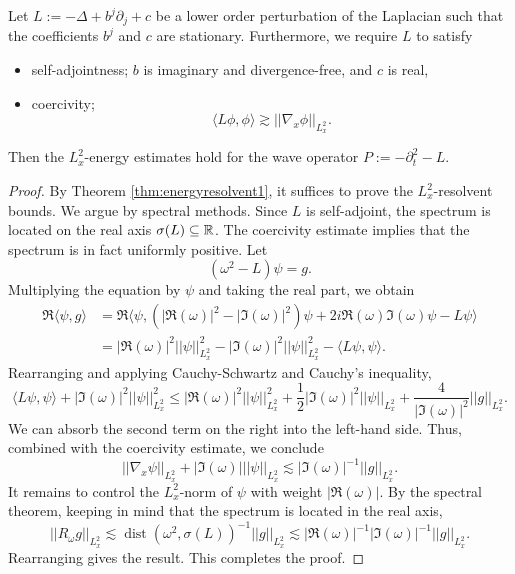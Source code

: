 \begin{corollary}\label{cor:inspiration}
	Let $L := - \Delta + b^j \partial_j + c$ be a lower order perturbation of the Laplacian such that the coefficients $b^j$ and $c$ are stationary. Furthermore, we require $L$ to satisfy
		\begin{itemize}
			\item self-adjointness; $b$ is imaginary and divergence-free, and $c$ is real, 
			\item coercivity; 
				\[
					\langle L \phi, \phi \rangle \gtrsim ||\nabla_x \phi||_{L^2_x}.
				\]
		\end{itemize}
	Then the $L^2_x$-energy estimates hold for the wave operator $P := -\partial_t^2 - L$. 
\end{corollary}

\begin{proof}
	By Theorem \ref{thm:energyresolvent1}, it suffices to prove the $L^2_x$-resolvent bounds. We argue by spectral methods. Since $L$ is self-adjoint, the spectrum is located on the real axis $\sigma(L) \subseteq \mathbb R$. The coercivity estimate implies that the spectrum is in fact uniformly positive. Let
		\[
			(\omega^2 - L) \psi = g.
		\]
	Multiplying the equation by $\psi$ and taking the real part, we obtain
		\begin{align*}
			\Re \langle \psi, g \rangle
				& = \Re \langle \psi, (|\Re (\omega)|^2 - |\Im (\omega)|^2) \psi + 2 i \Re (\omega) \Im(\omega) \psi - L \psi \rangle \\
				&= |\Re (\omega)|^2 ||\psi||_{L^2_x}^2 - |\Im (\omega)|^2 ||\psi||_{L^2_x}^2 - \langle L\psi, \psi \rangle.
		\end{align*}
	Rearranging and applying Cauchy-Schwartz and Cauchy's inequality, 
		\[
			 \langle L\psi, \psi \rangle +  |\Im (\omega)|^2 ||\psi||_{L^2_x}^2 \leq |\Re(\omega)|^2 ||\psi||_{L^2_x}^2 + \frac12 |\Im (\omega)|^2||\psi||_{L^2_x} +  \frac{4}{|\Im (\omega)|^2}    ||g||_{L^2_x}.
		\]	
	We can absorb the second term on the right into the left-hand side. Thus, combined with the coercivity estimate, we conclude
		\[
			||\nabla_x \psi||_{L^2_x} + |\Im (\omega)| ||\psi||_{L^2_x} \lesssim |\Im (\omega)|^{-1} ||g||_{L^2_x}.
		\]
	It remains to control the $L^2_x$-norm of $\psi$ with weight $|\Re(\omega)|$. By the spectral theorem, keeping in mind that the spectrum is located in the real axis, 
		\[
			||R_\omega g||_{L^2_x} \lesssim \operatorname{dist} (\omega^2, \sigma(L))^{-1} ||g||_{L^2_x} \lesssim |\Re(\omega)|^{-1} |\Im (\omega)|^{-1} ||g||_{L^2_x}.
		\]
	Rearranging gives the result. This completes the proof. 	
\end{proof}

